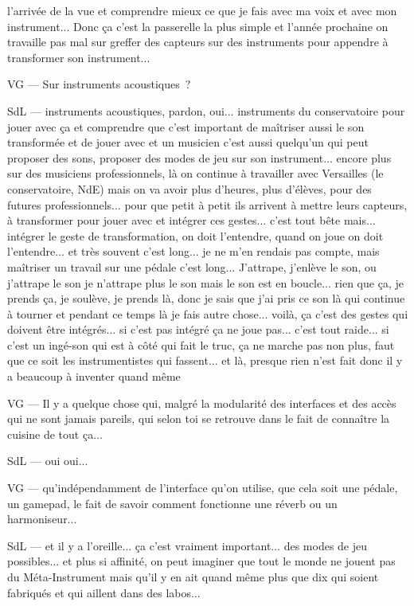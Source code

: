 l'arrivée de la vue et comprendre mieux ce que je fais avec ma voix et avec mon instrument... Donc ça c'est la passerelle la plus simple et l'année prochaine on travaille pas mal sur greffer des capteurs sur des instruments pour appendre à transformer son instrument... 

VG — Sur instruments acoustiques ? 

SdL — instruments acoustiques, pardon, oui... instruments du conservatoire pour jouer avec ça et comprendre que c'est important de maîtriser aussi le son transformée et de jouer avec et un musicien c'est aussi quelqu'un qui peut proposer des sons, proposer des modes de jeu sur son instrument... encore plus sur des musiciens professionnels, là on continue à travailler avec Versailles (le conservatoire, NdE) mais on va avoir plus d'heures, plus d'élèves, pour des futures professionnels... pour que petit à petit ils arrivent à mettre leurs capteurs, à transformer pour jouer avec et intégrer ces gestes... c'est tout bête mais... intégrer le geste de transformation, on doit l'entendre, quand on joue on doit l'entendre... et très souvent c'est long... je ne m'en rendais pas compte, mais maîtriser un travail sur une pédale c'est long... J'attrape, j'enlève le son, ou j'attrape le son je n'attrape plus le son mais le son est en boucle... rien que ça, je prends ça, je soulève, je prends là, donc je sais que j'ai pris ce son là qui continue à tourner et pendant ce temps là je fais autre chose... voilà, ça c'est des gestes qui doivent être intégrés... si c'est pas intégré ça ne joue pas... c'est tout raide... si c'est un ingé-son qui est à côté qui fait le truc, ça ne marche pas non plus, faut que ce soit les instrumentistes qui fassent... et là, presque rien n'est fait donc il y a beaucoup à inventer quand même 

VG — Il y a quelque chose qui, malgré la modularité des interfaces et des accès qui ne sont jamais pareils, qui selon toi se retrouve dans le fait de connaître la cuisine de tout ça... 

SdL — oui oui... 

VG — qu'indépendamment de l'interface qu'on utilise, que cela soit une pédale, un gamepad, le fait de savoir comment fonctionne une réverb ou un harmoniseur... 

SdL — et il y a l'oreille... ça c'est vraiment important... des modes de jeu possibles... et plus si affinité, on peut imaginer que tout le monde ne jouent pas du Méta-Instrument mais qu'il y en ait quand même plus que dix qui soient fabriqués et qui aillent dans des labos... 

